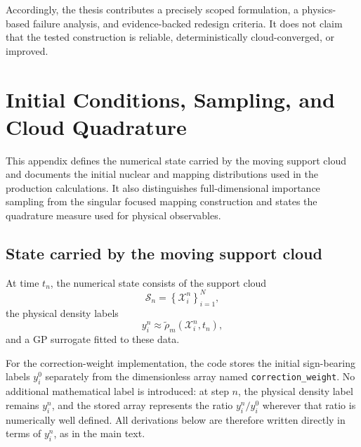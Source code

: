 \documentclass[
  11pt,
  letterpaper,
  onehalfspacing,
  normalmargins,
  equalmargins,
  oneside
]{ut-thesis}
\begin{document}
Accordingly, the thesis contributes a precisely scoped formulation, a
physics-based failure analysis, and evidence-backed redesign criteria. It
does not claim that the tested construction is reliable, deterministically
cloud-converged, or improved.

\appendix

\chapter[Initial Conditions and Sampling]{Initial Conditions, Sampling, and Cloud Quadrature}
\label{app:initial-conditions-sampling}

This appendix defines the numerical state carried by the moving support cloud
and documents the initial nuclear and mapping distributions used in the
production calculations. It also distinguishes full-dimensional importance
sampling from the singular focused mapping construction and states the
quadrature measure used for physical observables.

\section{State carried by the moving support cloud}
\label{appsec:cloud-state}

At time \(t_n\), the numerical state consists of the support cloud
\begin{equation}
\mathcal S_n
=
\left\{
\boldsymbol{\mathcal X}_i^n
\right\}_{i=1}^{N},
\label{appeq:support-cloud}
\end{equation}
the physical density labels
\begin{equation}
y_i^n
\approx
\tilde\rho_m
\left(
\boldsymbol{\mathcal X}_i^n,t_n
\right),
\label{appeq:live-physical-label}
\end{equation}
and a GP surrogate fitted to these data.

For the correction-weight implementation, the code stores the initial
sign-bearing labels \(y_i^0\) separately from the dimensionless array named
\texttt{correction\_}\allowbreak\texttt{weight}. No additional mathematical
label is introduced:
at step \(n\), the physical density label remains \(y_i^n\), and the stored
array represents the ratio \(y_i^n/y_i^0\) wherever that ratio is numerically
well defined. All derivations below are therefore written directly in terms
of \(y_i^n\), as in the main text.
\end{document}

